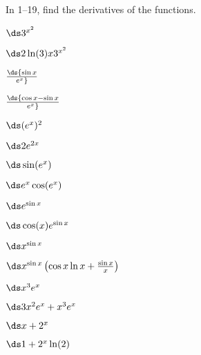 \begin{exercises}
In 1--19, find the derivatives of the functions.

\twocol

\begin{exercise} $\ds 3^{x^2}$
\begin{answer} $\ds 2\ln(3)x3^{x^2}$
\end{answer}\end{exercise}

\begin{exercise} $\ds {\sin x \over e^x}$
\begin{answer} $\ds {\cos x-\sin x \over e^x}$
\end{answer}\end{exercise}

\begin{exercise} $\ds (e^x)^2$
\begin{answer} $\ds 2e^{2x}$
\end{answer}\end{exercise}

\begin{exercise} $\ds \sin(e^x)$
\begin{answer} $\ds e^x\cos(e^x)$
\end{answer}\end{exercise}

\begin{exercise} $\ds e^{\sin x}$
\begin{answer} $\ds  \cos (x) e^{\sin x}$
\end{answer}\end{exercise}

\begin{exercise} $\ds x^{\sin x}$
\begin{answer} $\ds x^{\sin x}\left(\cos x\ln x+{\sin x\over x}\right)$
\end{answer}\end{exercise}

\begin{exercise}  $\ds x^3e^x$
\begin{answer} $\ds 3x^2e^x+x^3e^x$
\end{answer}\end{exercise}

\begin{exercise}  $\ds x+2^x$
\begin{answer} $\ds 1+2^x\ln(2)$
\end{answer}\end{exercise}


\end{exercises}
